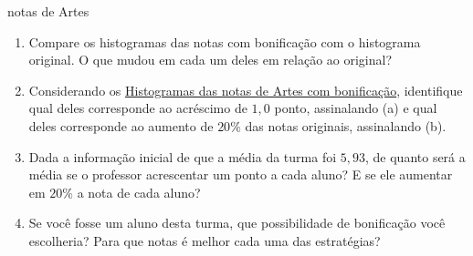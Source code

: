 \begin{task}{ notas de Artes}
\begin{enumerate}
\item {} 
Compare os histogramas das notas com bonificação com o histograma original. O que mudou em cada um deles em relação ao original?


\item {} 
Considerando os \hyperref[\detokenize{figura-notas2}]{Histogramas das notas de Artes com bonificação}, identifique qual deles corresponde ao  acréscimo de $1{,}0$ ponto, assinalando (a) e qual deles corresponde ao aumento de $20\%$ das notas originais, assinalando (b).

\item {} 
Dada a informação inicial de que a média da turma foi $5{,}93$, de quanto será a média se o professor acrescentar um ponto a cada aluno? E se ele aumentar em $20\%$ a nota de cada aluno?

\item {} 
Se você fosse um aluno desta turma, que possibilidade de bonificação você escolheria? Para que notas é melhor cada uma das estratégias?

\end{enumerate}
\end{task}


